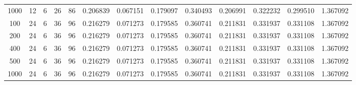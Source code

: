 \begin{table}[h]
\begin{tabular}{ccccccccccccc}
1000 & 12 & 6 & 26 & 86 & 0.206839 & 0.067151 & 0.179097 & 0.340493 & 0.206991 & 0.322232 & 0.299510 & 1.367092 \\
100 & 24 & 6 & 36 & 96 & 0.216279 & 0.071273 & 0.179585 & 0.360741 & 0.211831 & 0.331937 & 0.331108 & 1.367092 \\
200 & 24 & 6 & 36 & 96 & 0.216279 & 0.071273 & 0.179585 & 0.360741 & 0.211831 & 0.331937 & 0.331108 & 1.367092 \\
400 & 24 & 6 & 36 & 96 & 0.216279 & 0.071273 & 0.179585 & 0.360741 & 0.211831 & 0.331937 & 0.331108 & 1.367092 \\
500 & 24 & 6 & 36 & 96 & 0.216279 & 0.071273 & 0.179585 & 0.360741 & 0.211831 & 0.331937 & 0.331108 & 1.367092 \\
1000 & 24 & 6 & 36 & 96 & 0.216279 & 0.071273 & 0.179585 & 0.360741 & 0.211831 & 0.331937 & 0.331108 & 1.367092 \\
\bottomrule
\end{tabular}
\end{table}
